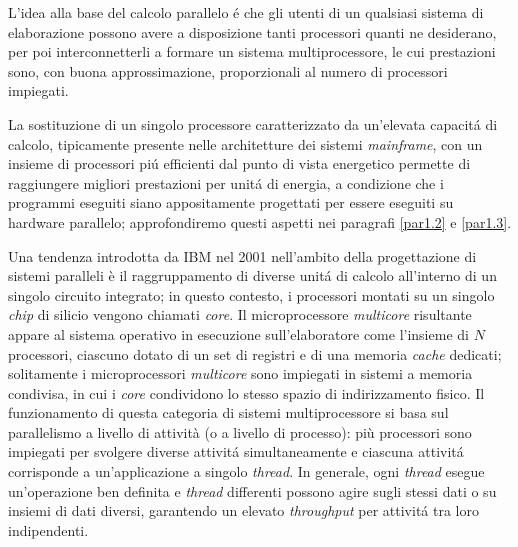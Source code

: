 \nocite{Patterson2022}
L'idea alla base del calcolo parallelo \'e che gli utenti di un qualsiasi sistema di elaborazione possono avere a disposizione tanti processori
quanti ne desiderano, per poi interconnetterli a formare un sistema
multiprocessore, le cui prestazioni sono, con buona approssimazione,
proporzionali al numero di processori impiegati.

La sostituzione di un singolo processore caratterizzato da un'elevata
capacit\'a di calcolo, tipicamente presente nelle architetture dei sistemi
\textit{mainframe}, con un insieme di processori pi\'u efficienti
dal punto di vista energetico permette di raggiungere migliori prestazioni
per unit\'a di energia, a condizione che i programmi eseguiti siano
appositamente progettati per essere eseguiti su hardware parallelo; approfondiremo questi aspetti nei paragrafi \ref{par1.2} e \ref{par1.3}.

Una tendenza introdotta da IBM nel 2001 nell'ambito della progettazione di sistemi paralleli \cite{Tendler2001} è il raggruppamento
di diverse unit\'a di calcolo all'interno di un singolo circuito integrato; in questo contesto, i processori montati su un singolo \textit{chip} di silicio vengono chiamati \textit{core}.\newline
Il microprocessore \textit{multicore} risultante appare al sistema operativo in esecuzione sull'elaboratore come l'insieme di $N$ processori, ciascuno dotato di un set di registri e di una memoria \textit{cache} dedicati; solitamente i microprocessori \textit{multicore} sono impiegati in sistemi a memoria condivisa, in cui i \textit{core} condividono lo stesso spazio di indirizzamento fisico.\newline
Il funzionamento di questa categoria di sistemi multiprocessore si basa sul parallelismo a livello di attività (o a livello di processo): più
processori sono impiegati per svolgere diverse attivit\'a simultaneamente e ciascuna attivit\'a corrisponde a un'applicazione a singolo
\textit{thread}.\newline
In generale, ogni \textit{thread} esegue un'operazione ben definita e \textit{thread} differenti possono agire sugli stessi
dati o su insiemi di dati diversi, garantendo un elevato \textit{throughput} per attivit\'a tra loro indipendenti.

